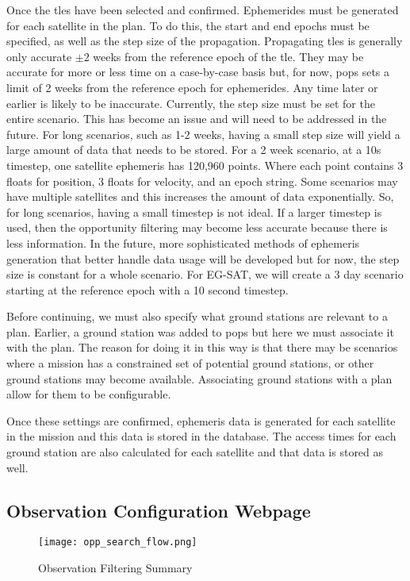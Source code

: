 Once the \glspl{tle} have been selected and confirmed. Ephemerides must be
generated for each satellite in the plan. To do this, the start and end epochs
must be specified, as well as the step size of the propagation. Propagating
\glspl{tle} is generally only accurate $\pm 2$ weeks from the reference epoch
of the \gls{tle}. They may be accurate for more or less time on a case-by-case
basis but, for now, \gls{pops} sets a limit of 2 weeks from the reference epoch
for ephemerides. Any time later or earlier is likely to be inaccurate.
Currently, the step size must be set for the entire scenario. This has become
an issue and will need to be addressed in the future. For long scenarios, such
as 1-2 weeks, having a small step size will yield a large amount of data that
needs to be stored. For a 2 week scenario, at a 10s timestep, one satellite
ephemeris has 120,960 points.  Where each point contains 3 floats for position,
3 floats for velocity, and an epoch string. Some scenarios may have multiple
satellites and this increases the amount of data exponentially. So, for long
scenarios, having a small timestep is not ideal. If a larger timestep is used,
then the opportunity filtering may become less accurate because there is less
information. In the future, more sophisticated methods of ephemeris generation
that better handle data usage will be developed but for now, the step size is
constant for a whole scenario. For EG-SAT, we will create a 3 day scenario
starting at the reference epoch with a 10 second timestep. 

Before continuing, we must also specify what ground stations are relevant to a
plan. Earlier, a ground station was added to \gls{pops} but here we must
associate it with the plan. The reason for doing it in this way is that there
may be scenarios where a mission has a constrained set of potential ground
stations, or other ground stations may become available. Associating ground
stations with a plan allow for them to be configurable. 

Once these settings are confirmed, ephemeris data is generated for each
satellite in the mission and this data is stored in the database. The access
times for each ground station are also calculated for each satellite and that
data is stored as well.


\subsection{Observation Configuration Webpage}

\begin{figure}[h]
    \centering
    \texttt{[image: opp\_search\_flow.png]} 
    \caption{Observation Filtering Summary}
    \label{fig:obs_fil} 
\end{figure}

